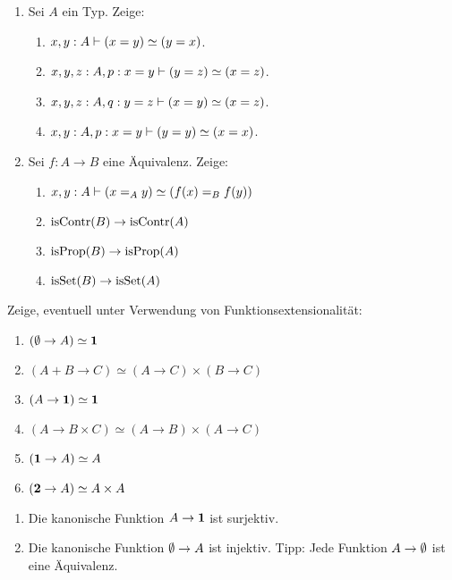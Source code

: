 \documentclass{uebung}
\begin{document}
\begin{exercise}
  \begin{enumerate}
    \item Sei $A$ ein Typ.
      Zeige:
        \begin{enumerate}
          \item $x,y:A \vdash (x=y) \simeq (y=x)$.
          \item $x,y,z:A,p:x=y \vdash (y=z) \simeq (x=z)$.
          \item $x,y,z:A,q:y=z \vdash (x=y) \simeq (x=z)$.
          \item $x,y:A,p:x=y \vdash (y=y) \simeq (x=x)$.
        \end{enumerate}

    \item Sei $f:A\to B$ eine Äquivalenz.
      Zeige:
        \begin{enumerate}
          \item $x,y:A\vdash (x =_A y)\simeq (f(x) =_B f(y))$
          \item $\mathrm{isContr}(B)\to\mathrm{isContr}(A)$
          \item $\mathrm{isProp}(B)\to\mathrm{isProp}(A)$
          \item $\mathrm{isSet}(B)\to\mathrm{isSet}(A)$
        \end{enumerate}
  \end{enumerate}
\end{exercise}

\begin{exercise}
  Zeige, eventuell unter Verwendung von Funktionsextensionalität:
  \begin{multicols}{2}
  \begin{enumerate}
    \item $(\emptyset \to A) \simeq \mathbf{1}$
    \item $(A+B\to C) \simeq (A \to C) \times (B \to C)$
    \item $(A \to \mathbf{1}) \simeq \mathbf{1}$
    \item $(A \to B\times C) \simeq (A \to B) \times (A \to C)$
    \item $(\mathbf{1} \to A)\simeq A$
    \item $(\mathbf{2} \to A)\simeq A\times A$
  \end{enumerate}
  \end{multicols}
\end{exercise}

\begin{bonus}
  \begin{enumerate}
    \item Die kanonische Funktion $A\to\mathbf{1}$ ist surjektiv.
    \item Die kanonische Funktion $\emptyset\to A$ ist injektiv.
      {\tiny Tipp: Jede Funktion $A\to\emptyset$ ist eine Äquivalenz.}
  \end{enumerate}
\end{bonus}
\end{document}
